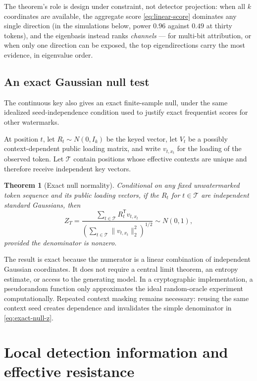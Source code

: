\documentclass[11pt]{article}
\newtheorem{theorem}{Theorem}[section]
\theoremstyle{definition}
\theoremstyle{remark}
\newcommand{\trans}{\mathsf{T}}
\begin{document}
The theorem's role is design under constraint, not detector
projection: when all $k$ coordinates are available, the aggregate score
\eqref{eq:linear-score} dominates any single direction (in the
simulations below, power $0.96$ against $0.49$ at thirty tokens), and
the eigenbasis instead ranks \emph{channels} --- for multi-bit
attribution, or when only one direction can be exposed, the top
eigendirections carry the most evidence, in eigenvalue order.

\subsection{An exact Gaussian null test}

The continuous key also gives an exact finite-sample null, under the same idealized seed-independence condition used to justify exact frequentist scores for other watermarks.

At position $t$, let $R_t\sim N(0,I_k)$ be the keyed vector, let $V_t$ be a possibly context-dependent public loading matrix, and write $v_{t,x_t}$ for the loading of the observed token. Let $\mathcal T$ contain positions whose effective contexts are unique and therefore receive independent key vectors.

\begin{theorem}[Exact null normality]
\label{thm:exact-null}
Conditional on any fixed unwatermarked token sequence and its public loading vectors, if the $R_t$ for $t\in\mathcal T$ are independent standard Gaussians, then
\begin{equation}
Z_T=
\frac{\sum_{t\in\mathcal T}R_t^\trans v_{t,x_t}}
{\left(\sum_{t\in\mathcal T}\|v_{t,x_t}\|_2^2\right)^{1/2}}
\sim N(0,1),
\label{eq:exact-null-z}
\end{equation}
provided the denominator is nonzero.
\end{theorem}

The result is exact because the numerator is a linear combination of independent Gaussian coordinates. It does not require a central limit theorem, an entropy estimate, or access to the generating model. In a cryptographic implementation, a pseudorandom function only approximates the ideal random-oracle experiment computationally. Repeated context masking remains necessary: reusing the same context seed creates dependence and invalidates the simple denominator in \eqref{eq:exact-null-z}.

\section{Local detection information and effective resistance}
\label{sec:local-geometry}
\end{document}
